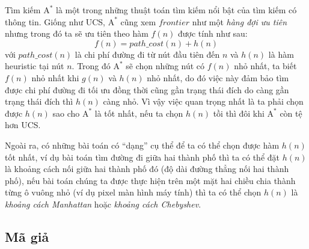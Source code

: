 Tìm kiếm $\text{A}^*$ là một trong những thuật toán tìm kiếm nổi bật của tìm kiếm có thông tin. Giống như UCS, $\text{A}^*$ cũng xem $frontier$ như một \textit{hàng đợi ưu tiên} nhưng trong đó ta sẽ ưu tiên theo hàm $f(n)$ được tính như sau:
$$
f(n) = path\_cost(n) + h(n)
$$
với $path\_cost(n)$ là chi phí đường đi từ nút đầu tiên đến $n$ và $h(n)$ là hàm heuristic tại nút $n$. Trong đó $\text{A}^*$ sẽ chọn những nút có $f(n)$ nhỏ nhất, ta biết $f(n)$ nhỏ nhất khi $g(n)$ và $h(n)$ nhỏ nhất, do đó việc này đảm bảo tìm được chi phí đường đi tối ưu đồng thời cũng gần trạng thái đích do càng gần trạng thái đích thì $h(n)$ càng nhỏ. Vì vậy việc quan trọng nhất là ta phải chọn được $h(n)$ sao cho $\text{A}^*$ là tốt nhất, nếu ta chọn $h(n)$ tồi thì đôi khi $\text{A}^*$ còn tệ hơn UCS.
\vspace{7pt}

Ngoài ra, có những bài toán có ``dạng'' cụ thể để ta có thể chọn được hàm $h(n)$ tốt nhất, ví dụ bài toán tìm đường đi giữa hai thành phố thì ta có thể đặt $h(n)$ là khoảng cách nối giữa hai thành phố đó (độ dài đường thẳng nối hai thành phố), nếu bài toán chúng ta được thực hiện trên một mặt hai chiều chia thành từng ô vuông nhỏ (ví dụ pixel màn hình máy tính) thì ta có thể chọn $h(n)$ là \textit{khoảng cách Manhattan} hoặc \textit{khoảng cách Chebyshev}.

\subsection{Mã giả}

